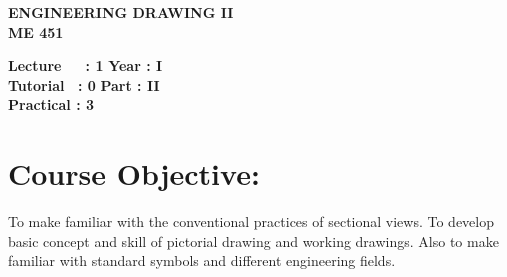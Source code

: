 \begin{center}
    \textbf{\huge{\uppercase{Engineering Drawing II}}}
    \\
    \vspace{.5cm}
    \textbf{\large{ME 451}}
\end{center}

\noindent\textbf{Lecture\ \ \ : 1} \hfill \textbf{Year : I } \\
\textbf{Tutorial \ : 0} \hfill \textbf{Part : II } \\
\textbf{Practical : 3}  \\

\par
\noindent 
\section*{Course Objective:}
To make familiar with the conventional practices of sectional views. To develop basic concept and skill of pictorial drawing and working drawings. Also to make familiar with standard symbols and different engineering fields.

